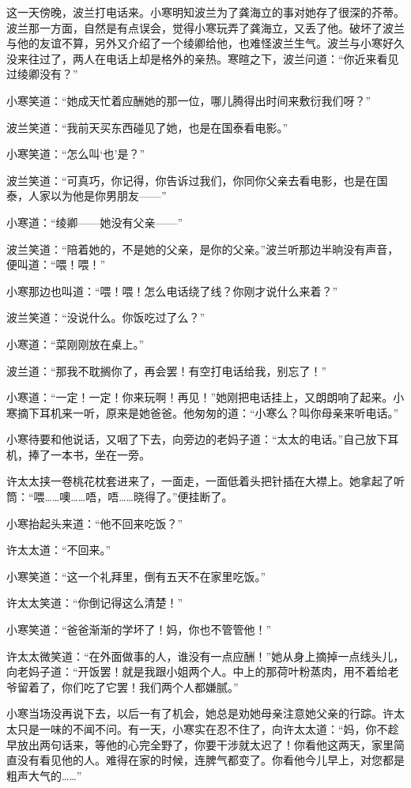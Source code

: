 \par 这一天傍晚，波兰打电话来。小寒明知波兰为了龚海立的事对她存了很深的芥蒂。波兰那一方面，自然是有点误会，觉得小寒玩弄了龚海立，又丢了他。破坏了波兰与他的友谊不算，另外又介绍了一个绫卿给他，也难怪波兰生气。波兰与小寒好久没来往过了，两人在电话上却是格外的亲热。寒暄之下，波兰问道：“你近来看见过绫卿没有？”
\par 小寒笑道：“她成天忙着应酬她的那一位，哪儿腾得出时间来敷衍我们呀？”
\par 波兰笑道：“我前天买东西碰见了她，也是在国泰看电影。”
\par 小寒笑道：“怎么叫‘也’是？”
\par 波兰笑道：“可真巧，你记得，你告诉过我们，你同你父亲去看电影，也是在国泰，人家以为他是你男朋友——”
\par 小寒道：“绫卿——她没有父亲——”
\par 波兰笑道：“陪着她的，不是她的父亲，是你的父亲。”波兰听那边半晌没有声音，便叫道：“喂！喂！”
\par 小寒那边也叫道：“喂！喂！怎么电话绕了线？你刚才说什么来着？”
\par 波兰笑道：“没说什么。你饭吃过了么？”
\par 小寒道：“菜刚刚放在桌上。”
\par 波兰道：“那我不耽搁你了，再会罢！有空打电话给我，别忘了！”
\par 小寒道：“一定！一定！你来玩啊！再见！”她刚把电话挂上，又朗朗响了起来。小寒摘下耳机来一听，原来是她爸爸。他匆匆的道：“小寒么？叫你母亲来听电话。”
\par 小寒待要和他说话，又咽了下去，向旁边的老妈子道：“太太的电话。”自己放下耳机，捧了一本书，坐在一旁。
\par 许太太挟一卷桃花枕套进来了，一面走，一面低着头把针插在大襟上。她拿起了听筒：“喂……噢……唔，唔……晓得了。”便挂断了。
\par 小寒抬起头来道：“他不回来吃饭？”
\par 许太太道：“不回来。”
\par 小寒笑道：“这一个礼拜里，倒有五天不在家里吃饭。”
\par 许太太笑道：“你倒记得这么清楚！”
\par 小寒笑道：“爸爸渐渐的学坏了！妈，你也不管管他！”
\par 许太太微笑道：“在外面做事的人，谁没有一点应酬！”她从身上摘掉一点线头儿，向老妈子道：“开饭罢！就是我跟小姐两个人。中上的那荷叶粉蒸肉，用不着给老爷留着了，你们吃了它罢！我们两个人都嫌腻。”
\par 小寒当场没再说下去，以后一有了机会，她总是劝她母亲注意她父亲的行踪。许太太只是一味的不闻不问。有一天，小寒实在忍不住了，向许太太道：“妈，你不趁早放出两句话来，等他的心完全野了，你要干涉就太迟了！你看他这两天，家里简直没有看见他的人。难得在家的时候，连脾气都变了。你看他今儿早上，对您都是粗声大气的……”
